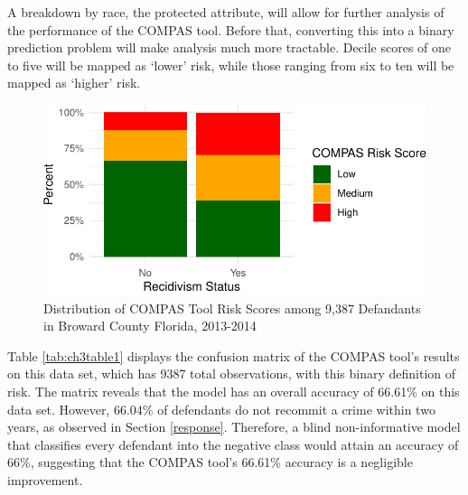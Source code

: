 \documentclass[12pt, twoside]{amherstthesis}
\begin{document}
A breakdown by race, the protected attribute, will allow for further analysis of the performance of the COMPAS tool. Before that, converting this into a binary prediction problem will make analysis much more tractable. Decile scores of one to five will be mapped as `lower' risk, while those ranging from six to ten will be mapped as `higher' risk.
\begin{figure}

{\centering \includegraphics{Dasha-Asienga_StatThesis_files/figure-latex/ch3fig9-1} 

}

\caption{Distribution of COMPAS Tool Risk Scores among 9,387 Defandants in Broward County Florida, 2013-2014}\label{fig:ch3fig9}
\end{figure}
Table \ref{tab:ch3table1} displays the confusion matrix of the COMPAS tool's results on this data set, which has 9387 total observations, with this binary definition of risk. The matrix reveals that the model has an overall accuracy of 66.61\% on this data set. However, 66.04\% of defendants do not recommit a crime within two years, as observed in Section \ref{response}. Therefore, a blind non-informative model that classifies every defendant into the negative class would attain an accuracy of 66\%, suggesting that the COMPAS tool's 66.61\% accuracy is a negligible improvement.
\end{document}
